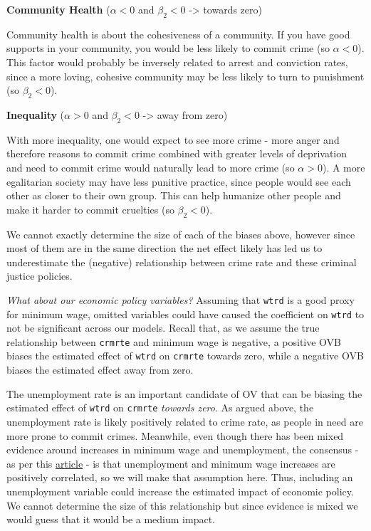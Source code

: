 \documentclass[]{article}
\begin{document}
\textbf{Community Health} (\(\alpha < 0\) and \(\beta_2 < 0\)
-\textgreater{} towards zero)

Community health is about the cohesiveness of a community. If you have
good supports in your community, you would be less likely to commit
crime (so \(\alpha < 0\)). This factor would probably be inversely
related to arrest and conviction rates, since a more loving, cohesive
community may be less likely to turn to punishment (so \(\beta_2 < 0\)).

\textbf{Inequality} (\(\alpha > 0\) and \(\beta_2 < 0\) -\textgreater{}
away from zero)

With more inequality, one would expect to see more crime - more anger
and therefore reasons to commit crime combined with greater levels of
deprivation and need to commit crime would naturally lead to more crime
(so \(\alpha > 0\)). A more egalitarian society may have less punitive
practice, since people would see each other as closer to their own
group. This can help humanize other people and make it harder to commit
cruelties (so \(\beta_2 < 0\)).

We cannot exactly determine the size of each of the biases above,
however since most of them are in the same direction the net effect
likely has led us to underestimate the (negative) relationship between
crime rate and these criminal justice policies.

\emph{What about our economic policy variables?} Assuming that
\texttt{wtrd} is a good proxy for minimum wage, omitted variables could
have caused the coefficient on \texttt{wtrd} to not be significant
across our models. Recall that, as we assume the true relationship
between \texttt{crmrte} and minimum wage is negative, a positive OVB
biases the estimated effect of \texttt{wtrd} on \texttt{crmrte} towards
zero, while a negative OVB biases the estimated effect away from zero.

The unemployment rate is an important candidate of OV that can be
biasing the estimated effect of \texttt{wtrd} on \texttt{crmrte}
\emph{towards zero}. As argued above, the unemployment rate is likely
positively related to crime rate, as people in need are more prone to
commit crimes. Meanwhile, even though there has been mixed evidence
around increases in minimum wage and unemployment, the consensus - as
per this
\href{https://journals.sagepub.com/doi/abs/10.1177/001979399204600105}{article}
- is that unemployment and minimum wage increases are positively
correlated, so we will make that assumption here. Thus, including an
unemployment variable could increase the estimated impact of economic
policy. We cannot determine the size of this relationship but since
evidence is mixed we would guess that it would be a medium impact.
\end{document}
